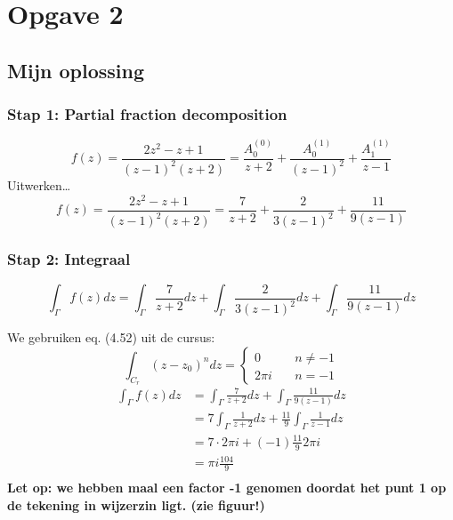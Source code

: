 \documentclass[a4paper,twoside]{article}
\theoremstyle{definition}
\theoremstyle{plain}
\begin{document}
\section{Opgave 2}
\subsection{Mijn oplossing}
\subsubsection{Stap 1: Partial fraction decomposition}

\[f(z) = \frac{2z^2 - z + 1}{(z-1)^2(z+2)} = \frac{A_0^{(0)}}{z+2} + \frac{A_0^{(1)}}{(z-1)^2} + \frac{A_1^{(1)}}{z-1}\]
Uitwerken\dots
\[f(z) = \frac{2z^2 - z + 1}{(z-1)^2(z+2)} = \frac{7}{z+2} + \frac{2}{3(z-1)^2} + \frac{11}{9(z-1)}\]
\subsubsection{Stap 2: Integraal}
\[
\int_\Gamma f(z)dz = \int_\Gamma\frac{7}{z+2}dz  + \int_\Gamma\frac{2}{3(z-1)^2} dz + \int_\Gamma\frac{11}{9(z-1) }dz
\]

We gebruiken eq. (4.52) uit de cursus:
\[
\int_{C_r} (z-z_0)^n dz = \begin{cases}
    0 \quad & n \neq -1\\
    2 \pi i \quad & n = -1
\end{cases}
\]
\begin{align*}
    \int_\Gamma f(z)dz &= \int_\Gamma\frac{7}{z+2}dz  + \int_\Gamma\frac{11}{9(z-1) }dz\\
    &= 7 \int_\Gamma\frac{1}{z+2}dz  +  \frac{11}{9}\int_\Gamma\frac{1}{z-1} dz\\
    &= 7 \cdot 2\pi i + (-1) \frac{11}{9} 2\pi i\\
    &= \pi i \frac{104}{9}\\
\end{align*}
\textbf{Let op: we hebben maal een factor -1 genomen doordat het punt 1 op de tekening in wijzerzin ligt. (zie figuur!)}
\end{document}

